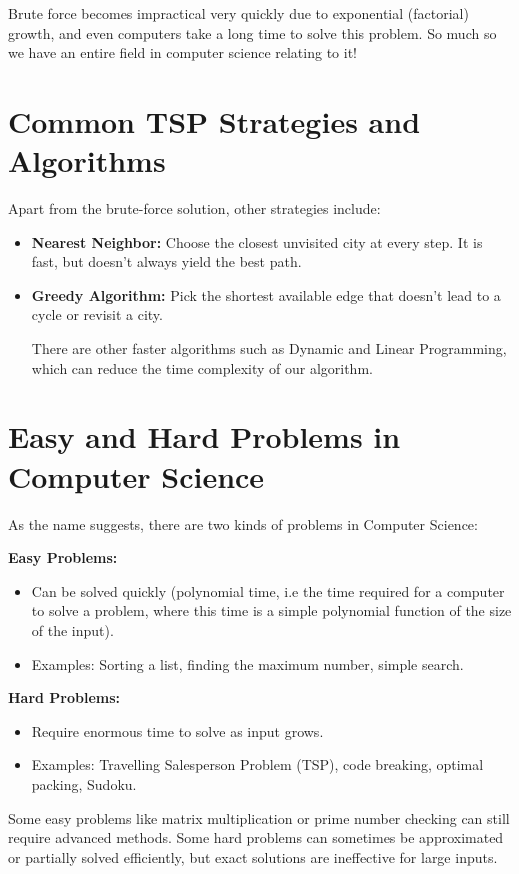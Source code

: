 \documentclass[12pt]{exam}
\begin{document}
Brute force becomes impractical very quickly due to exponential (factorial) growth, and even computers take a long time to solve this problem. So much so we have an entire field in computer science relating to it!

\section{Common TSP Strategies and Algorithms}
Apart from the brute-force solution, other strategies include:
\begin{itemize}
    \item \textbf{Nearest Neighbor:} Choose the closest unvisited city at every step. It is fast, but doesn't always yield the best path.
    \item \textbf{Greedy Algorithm:} Pick the shortest available edge that doesn’t lead to a cycle or revisit a city.
    
There are other faster algorithms such as Dynamic and Linear Programming, which can reduce the time complexity of our algorithm. 

\end{itemize}

\section{Easy and Hard Problems in Computer Science}

As the name suggests, there are two kinds of problems in Computer Science:

\textbf{Easy Problems:}
\begin{itemize}
    \item Can be solved quickly (polynomial time, i.e the time required for a computer to solve a problem, where this time is a simple polynomial function of the size of the input).
    \item Examples: Sorting a list, finding the maximum number, simple search.
\end{itemize}

\textbf{Hard Problems:}
\begin{itemize}
    \item Require enormous time to solve as input grows.
    \item Examples: Travelling Salesperson Problem (TSP), code breaking, optimal packing, Sudoku.
\end{itemize}

Some easy problems like matrix multiplication or prime number checking can still require advanced methods.  
Some hard problems can sometimes be approximated or partially solved efficiently, but exact solutions are ineffective for large inputs.
\end{document}
